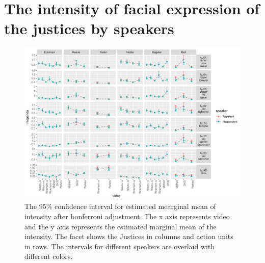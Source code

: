 \documentclass{monashthesis}
\begin{document}
\hypertarget{the-intensity-of-facial-expression-of-the-justices-by-speakers}{%
\section{The intensity of facial expression of the justices by speakers}\label{the-intensity-of-facial-expression-of-the-justices-by-speakers}}

\begin{figure}

{\centering \includegraphics[width=1\linewidth]{figures/intensity-speaker-1} 

}

\caption{The 95\% confidence interval for estimated mearginal mean of intensity after bonferroni adjustment. The x axis represents video and the y axis represents the estimated marginal mean of the intensity. The facet shows the Justices in columns and action units in rows. The intervals for different speakers are overlaid with different colors.}\label{fig:intensity-speaker}
\end{figure}

\printbibliography[heading=bibintoc]

\appendix
\end{document}
